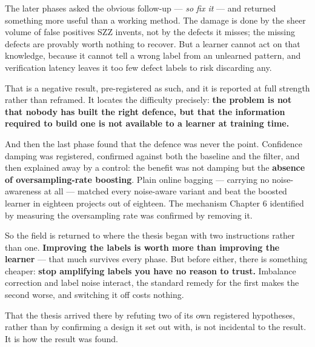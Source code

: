 The later phases asked the obvious follow-up --- \emph{so fix it} ---
and returned something more useful than a working method. The damage is
done by the sheer volume of false positives SZZ invents, not by the
defects it misses; the missing defects are provably worth nothing to
recover. But a learner cannot act on that knowledge, because it cannot
tell a wrong label from an unlearned pattern, and verification latency
leaves it too few defect labels to risk discarding any.

That is a negative result, pre-registered as such, and it is reported at
full strength rather than reframed. It locates the difficulty precisely:
\textbf{the problem is not that nobody has built the right defence, but
that the information required to build one is not available to a learner
at training time.}

And then the last phase found that the defence was never the point.
Confidence damping was registered, confirmed against both the baseline
and the filter, and then explained away by a control: the benefit was
not damping but the \textbf{absence of oversampling-rate boosting}.
Plain online bagging --- carrying no noise-awareness at all --- matched
every noise-aware variant and beat the boosted learner in eighteen
projects out of eighteen. The mechanism Chapter 6 identified by
measuring the oversampling rate was confirmed by removing it.

So the field is returned to where the thesis began with two instructions
rather than one. \textbf{Improving the labels is worth more than
improving the learner} --- that much survives every phase. But before
either, there is something cheaper: \textbf{stop amplifying labels you
have no reason to trust.} Imbalance correction and label noise interact,
the standard remedy for the first makes the second worse, and switching
it off costs nothing.

That the thesis arrived there by refuting two of its own registered
hypotheses, rather than by confirming a design it set out with, is not
incidental to the result. It is how the result was found.
